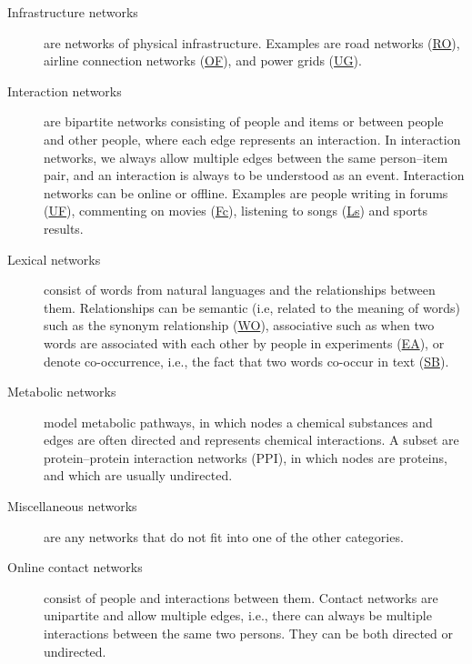 \documentclass{article}
\begin{document}
\begin{description}
\item[Infrastructure networks] are networks of physical infrastructure.  
  Examples are road networks
  (\href{http://konect.cc/networks/roadNet-CA/}{\textsf{RO}}), airline
  connection networks
  (\href{http://konect.cc/networks/opsahl-openflights/}{\textsf{OF}}), 
  and power grids
  (\href{http://konect.cc/networks/opsahl-powergrid/}{\textsf{UG}}).  
  
\item[Interaction networks] are bipartite networks consisting of people
  and items or between people and other people, where each edge represents an interaction. 
  In interaction networks, we always allow multiple edges between the
  same person--item pair, and an interaction is always to be understood as an event. 
  Interaction networks can be online or offline.
  Examples are
  people writing in forums
  (\href{http://konect.cc/networks/opsahl-ucforum/}{\textsf{UF}}),
  commenting on movies
  (\href{http://konect.cc/networks/filmtipset_comment/}{\textsf{Fc}}),
  listening to songs
  (\href{http://konect.cc/networks/lastfm_song/}{\textsf{Ls}})
  and sports results. 

\item[Lexical networks] consist of words from natural 
   languages and the relationships between
  them.  Relationships can be semantic (i.e, related to the meaning of
  words) such as the synonym relationship
  (\href{http://konect.cc/networks/wordnet-words/}{\textsf{WO}}),
  associative such as when two words are associated with each other by
  people in experiments
  (\href{http://konect.cc/networks/eat/}{\textsf{EA}}), or denote
  co-occurrence, i.e., the fact that two words co-occur in text
  (\href{http://konect.cc/networks/lasagne-spanishbook/}{\textsf{SB}}).

\item[Metabolic networks] model metabolic pathways,
   in which nodes a chemical substances
  and edges are often directed and represents chemical interactions.  A
  subset are protein--protein interaction networks (PPI), in which nodes
  are proteins, and which are usually undirected.

\item[Miscellaneous networks] are any networks that do not fit into one
  of the other categories. 
  
\item[Online contact networks] consist of people and interactions between
   them.  Contact networks are
  unipartite and allow multiple edges, i.e., there can always be
  multiple interactions between the same two persons.  They can be both
  directed or undirected.


\end{description}
\end{document}
